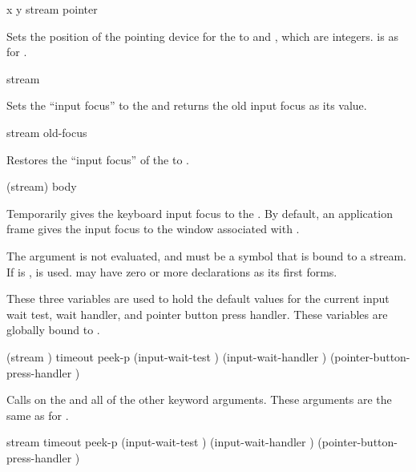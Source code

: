  {x y stream \key pointer}

Sets the position of the pointing device for the 
 to  and , which are integers.   is as
for .


 {stream}

Sets the ``input focus'' to the   and
returns the old input focus as its value.

 {stream old-focus}

Restores the ``input focus'' of the   to
.

 {(stream) \body body}

Temporarily gives the keyboard input focus to the 
.  By default, an application frame gives the input focus to the
window associated with .

The  argument is not evaluated, and must be a symbol that is bound
to a stream.  If  is ,  is used.
 may have zero or more declarations as its first forms.



These three variables are used to hold the default values for the current input
wait test, wait handler, and pointer button press handler.  These variables are
globally bound to .


 {\key (stream )
                            timeout peek-p 
                            (input-wait-test )
                            (input-wait-handler )
                            (pointer-button-press-handler )}

Calls  on the  
and all of the other keyword arguments.  These arguments are the same as for
.

 {stream
                                   \key timeout peek-p 
                                        (input-wait-test )
                                        (input-wait-handler )
                                        (pointer-button-press-handler )}

